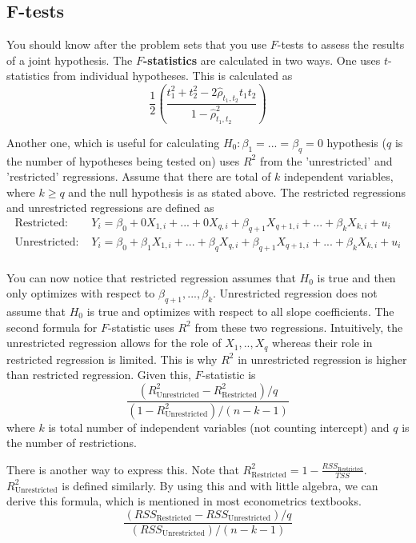 \documentclass[12pt]{article}
\theoremstyle{definition}
\theoremstyle{property}
\theoremstyle{assumption}
\theoremstyle{example}
\theoremstyle{comment}
\begin{document}
\subsection{F-tests}
You should know after the problem sets that you use $F$-tests to assess the results of a joint hypothesis. The \textbf{$F$-statistics} are calculated in two ways. One uses $t$-statistics from individual hypotheses. This is calculated as
\[
\frac{1}{2}\left(\frac{t_1^2+t_2^2-2\hat{\rho}_{t_1,t_2}t_1t_2}{1-\hat{\rho}^2_{t_1,t_2}}\right)
\]\par\medskip
Another one, which is useful for calculating $H_0: \beta_1 = ... =\beta_q=0$ hypothesis ($q$ is the number of hypotheses being tested on) uses $R^2$ from the 'unrestricted' and 'restricted' regressions. Assume that there are total of $k$ independent variables, where $k\geq q$ and the null hypothesis is as stated above. The restricted regressions and unrestricted regressions are defined as
\[\begin{aligned}
\text{Restricted: } & Y_i =\beta_0+ 0X_{1,i} + ...+ 0X_{q,i}+ \beta_{q+1}X_{q+1,i}+...+\beta_kX_{k,i} + u_i\\
\text{Unrestricted: } & Y_i = \beta_0+\beta_1X_{1,i} + ... +\beta_qX_{q,i}+ \beta_{q+1}X_{q+1,i}+...+\beta_kX_{k,i} + u_i\\
\end{aligned}\] \par\medskip
You can now notice that restricted regression assumes that $H_0$ is true and then only optimizes with respect to $\beta_{q+1},...,\beta_{k}$. Unrestricted regression does not assume that $H_0$ is true and optimizes with respect to all slope coefficients. The second formula for $F$-statistic uses $R^2$ from these two regressions. Intuitively, the unrestricted regression allows for the role of $X_1,..,X_q$ whereas their role in restricted regression is limited. This is why $R^2$ in unrestricted regression is higher than restricted regression. Given this, $F$-statistic is
\[
\frac{(R^2_{\text{Unrestricted}}-R^2_{\text{Restricted}})/q}{(1-R^2_{\text{Unrestricted}})/(n-k-1)}
\]
where $k$ is total number of independent variables (not counting intercept) and $q$ is the number of restrictions. \par\medskip
There is another way to express this. Note that $R^2_{\text{Restricted}} = 1-\frac{RSS_{\text{Restricted}}}{TSS}$. $R^2_{\text{Unrestricted}}$ is defined similarly. By using this and with little algebra, we can derive this formula, which is mentioned in most econometrics textbooks.
\[
\frac{(RSS_{\text{Restricted}}-RSS_{\text{Unrestricted}})/q}{(RSS_{\text{Unrestricted}})/(n-k-1)}
\] \par\medskip
\end{document}
